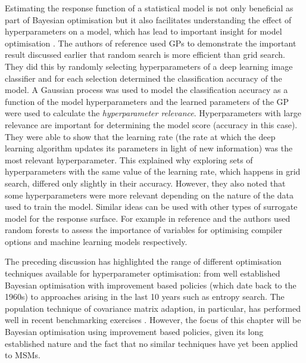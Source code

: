 Estimating the response function of a statistical model is not only beneficial as part of Bayesian optimisation but it also facilitates understanding the effect of hyperparameters on  a model, which has lead to important insight for model optimisation \cite{rasmussenGaussianProcessesMachine2006}. The authors of reference \cite{bergstrajamesbergstraRandomSearchHyperParameter2012} used GPs to demonstrate the important result discussed earlier that random search is more efficient than grid search. They did this by randomly selecting hyperparameters of a deep learning image classifier and for each selection determined the classification accuracy of the model. A Gaussian process was used to model the classification accuracy as a function of the model hyperparameters and the learned parameters of the GP were used to calculate the \emph{hyperparameter relevance}.  Hyperparameters with large relevance are important for determining the model score (accuracy in this case). They were able to show that the learning rate (the rate at which the deep learning algorithm updates its parameters in light of new information) was the most relevant hyperparameter. This explained why exploring sets of hyperparameters with the same value of the learning rate, which happens in grid search, differed only slightly in their accuracy. However, they also noted that some hyperparameters were more relevant depending on the nature of the data used to train the model. Similar ideas can be used with other types of surrogate model for the response surface. For example in  reference \cite{gramacyVariableSelectionSensitivity2013} and \cite{pmlr-v32-hutter14} the authors used  random forests to assess the importance of variables for optimising compiler options and machine learning models respectively. 

The preceding discussion has highlighted the range of different optimisation techniques available for hyperparameter optimisation: from well established Bayesian optimisation with improvement based policies (which date back to the 1960s) to approaches arising in the last 10 years such as entropy search. The population technique of covariance matrix adaption, in particular, has performed well in recent benchmarking exercises \cite{dufosse2019benchmarking,faury2019benchmarking,bodner2019benchmarking}. However, the focus of this chapter will be Bayesian optimisation using improvement based policies, given its long established nature and the fact that no similar techniques have yet been applied to MSMs.  


